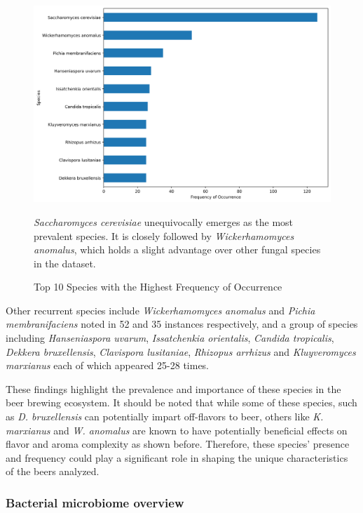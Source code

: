     \begin{figure}[H]
        \centering
        \includegraphics[scale=0.5]{images/overview/top10_species_fungal.png}
        \caption{Top 10 Species with the Highest Frequency of Occurrence}
        \small \textit{Saccharomyces cerevisiae} unequivocally emerges as the most prevalent species. It is closely followed by \textit{Wickerhamomyces anomalus}, which holds a slight advantage over other fungal species in the dataset.
        \label{fig:results:top10_species_fungal}
    \end{figure}
    
Other recurrent species include \textit{Wickerhamomyces anomalus} and \textit{Pichia membranifaciens} noted in 52 and 35 instances respectively, and a group of species including \textit{Hanseniaspora uvarum}, \textit{Issatchenkia orientalis}, \textit{Candida tropicalis}, \textit{Dekkera bruxellensis}, \textit{Clavispora lusitaniae}, \textit{Rhizopus arrhizus} and \textit{Kluyveromyces marxianus} each of which appeared 25-28 times.

These findings highlight the prevalence and importance of these species in the beer brewing ecosystem. It should be noted that while some of these species, such as \textit{D. bruxellensis} can potentially impart off-flavors to beer, others like \textit{K. marxianus} and \textit{W. anomalus} are known to have potentially beneficial effects on flavor and aroma complexity as shown before. Therefore, these species' presence and frequency could play a significant role in shaping the unique characteristics of the beers analyzed.
        


\subsubsection{Bacterial microbiome overview}

